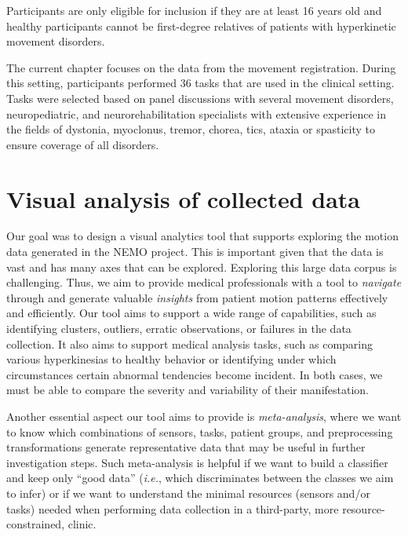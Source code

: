 Participants are only eligible for inclusion if they are at least 16 years old and healthy participants cannot be first-degree relatives of patients with hyperkinetic movement disorders. 

The current chapter focuses on the data from the movement registration. During this setting, participants performed 36 tasks that are used in the clinical setting. Tasks were selected based on panel discussions with several movement disorders, neuropediatric, and neurorehabilitation specialists with extensive experience in the fields of dystonia, myoclonus, tremor, chorea, tics, ataxia or spasticity to ensure coverage of all disorders.


\section{Visual analysis of collected data}
\label{sec:nemo_va}
%
Our goal was to design a visual analytics tool that supports exploring the motion data generated in the NEMO project. This is important given that the data is vast and has many axes that can be explored.
Exploring this large data corpus is challenging. Thus, we aim to provide medical professionals with a tool to \emph{navigate} through and generate valuable \emph{insights} from patient motion patterns effectively and efficiently. Our tool aims to support a wide range of capabilities, such as identifying clusters, outliers, erratic observations, or failures in the data collection. It also aims to support medical analysis tasks, such as comparing various hyperkinesias to healthy behavior or identifying under which circumstances certain abnormal tendencies become incident. In both cases, we must be able to compare the severity and variability of their manifestation.

Another essential aspect our tool aims to provide is \emph{meta-analysis}, where we want to know which combinations of sensors, tasks, patient groups, and preprocessing transformations generate representative data that may be useful in further investigation steps. Such meta-analysis is helpful if we want to build a classifier and keep only ``good data'' (\emph{i.e.}, which discriminates between the classes we aim to infer) or if we want to understand the minimal resources (sensors and/or tasks) needed when performing data collection in a third-party, more resource-constrained, clinic.

